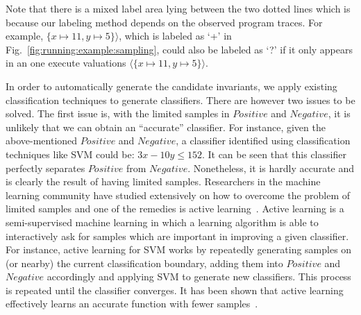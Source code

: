 Note that there is a mixed label area lying between the two dotted lines which is because our labeling method depends on the observed program traces.
For example, $\{x \mapsto 11, y \mapsto 5\} \rangle$, which is labeled as `+' in Fig.~\ref{fig:running:example:sampling}, 
could also be labeled as `?' if it only appears in an one execute valuations $\langle \{x \mapsto 11, y \mapsto 5\} \rangle$.

In order to automatically generate the candidate invariants, we apply existing classification techniques to generate classifiers. 
There are however two issues to be solved. The first issue is, with the limited samples in $\mathit{Positive}$ and $\mathit{Negative}$, 
it is unlikely that we can obtain an ``accurate'' classifier. 
For instance, given the above-mentioned $\mathit{Positive}$ and $\mathit{Negative}$, a classifier identified using classification techniques like SVM could be: $3x-10y \leq 152$. %
It can be seen that this classifier perfectly separates $\mathit{Positive}$ from $\mathit{Negative}$. 
Nonetheless, it is hardly accurate and is clearly the result of having limited samples. 
Researchers in the machine learning community have studied extensively on how to overcome the problem of limited samples and one of the remedies is active learning~\cite{DBLP:series/synthesis/2012Settles}. 
Active learning is a semi-supervised machine learning in which a learning algorithm is able to interactively ask for samples which are important in improving a given classifier. 
For instance, active learning for SVM works by repeatedly generating samples on (or nearby) the current classification boundary, adding them into $\mathit{Positive}$ and $\mathit{Negative}$ accordingly and applying SVM to generate new classifiers. 
This process is repeated until the classifier converges. It has been shown that active learning effectively learns an accurate function with fewer samples~\cite{DBLP:conf/icml/SchohnC00}.

